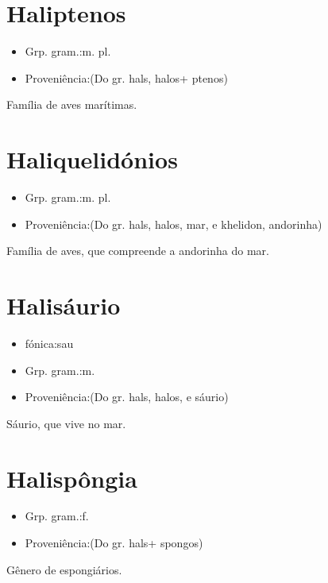 \documentclass{article}
\begin{document}
\section{Haliptenos}
\begin{itemize}
\item {Grp. gram.:m. pl.}
\end{itemize}
\begin{itemize}
\item {Proveniência:(Do gr. \textunderscore hals\textunderscore , \textunderscore halos\textunderscore  + \textunderscore ptenos\textunderscore )}
\end{itemize}
Família de aves marítimas.
\section{Haliquelidónios}
\begin{itemize}
\item {Grp. gram.:m. pl.}
\end{itemize}
\begin{itemize}
\item {Proveniência:(Do gr. \textunderscore hals\textunderscore , \textunderscore halos\textunderscore , mar, e \textunderscore khelidon\textunderscore , andorinha)}
\end{itemize}
Família de aves, que compreende a andorinha do mar.
\section{Halisáurio}
\begin{itemize}
\item {fónica:sau}
\end{itemize}
\begin{itemize}
\item {Grp. gram.:m.}
\end{itemize}
\begin{itemize}
\item {Proveniência:(Do gr. \textunderscore hals\textunderscore , \textunderscore halos\textunderscore , e \textunderscore sáurio\textunderscore )}
\end{itemize}
Sáurio, que vive no mar.
\section{Halispôngia}
\begin{itemize}
\item {Grp. gram.:f.}
\end{itemize}
\begin{itemize}
\item {Proveniência:(Do gr. \textunderscore hals\textunderscore  + \textunderscore spongos\textunderscore )}
\end{itemize}
Gênero de espongiários.
\end{document}

